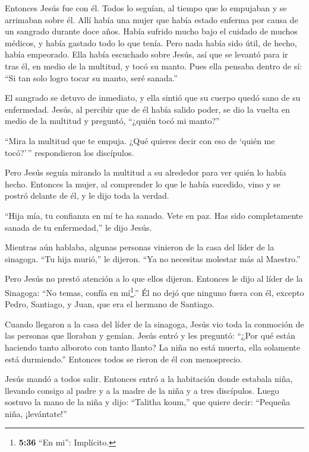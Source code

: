  Entonces Jesús fue con él. Todos lo seguían, al tiempo que
lo empujaban y se arrimaban sobre él.  Allí había una mujer
que había estado enferma por causa de un sangrado durante doce años.
 Había sufrido mucho bajo el cuidado de muchos médicos, y
había gastado todo lo que tenía. Pero nada había sido útil, de hecho,
había empeorado.  Ella había escuchado sobre Jesús, así que
se levantó para ir tras él, en medio de la multitud, y tocó su manto.
 Pues ella pensaba dentro de sí: ``Si tan solo logro tocar
su manto, seré sanada.''

 El sangrado se detuvo de inmediato, y ella sintió que su
cuerpo quedó sano de su enfermedad.  Jesús, al percibir que
de él había salido poder, se dio la vuelta en medio de la multitud y
preguntó, ``¿quién tocó mi manto?''

 ``Mira la multitud que te empuja. ¿Qué quieres decir con
eso de `quién me tocó?'\,'' respondieron los discípulos.

 Pero Jesús seguía mirando la multitud a su alrededor para
ver quién lo había hecho.  Entonces la mujer, al comprender
lo que le había sucedido, vino y se postró delante de él, y le dijo toda
la verdad.

 ``Hija mía, tu confianza en mí te ha sanado. Vete en paz.
Has sido completamente sanada de tu enfermedad,'' le dijo Jesús.

 Mientras aún hablaba, algunas personas vinieron de la casa
del líder de la sinagoga. ``Tu hija murió,'' le dijeron. ``Ya no
necesitas molestar más al Maestro.''

 Pero Jesús no prestó atención a lo que ellos dijeron.
Entonces le dijo al líder de la Sinagoga: ``No temas, confía en
mí\footnote{\textbf{5:36} ``En mi'': Implícito.}.''  Él no
dejó que ninguno fuera con él, excepto Pedro, Santiago, y Juan, que era
el hermano de Santiago.

 Cuando llegaron a la casa del líder de la sinagoga, Jesús
vio toda la conmoción de las personas que lloraban y gemían.
 Jesús entró y les preguntó: ``¿Por qué están haciendo
tanto alboroto con tanto llanto? La niña no está muerta, ella solamente
está durmiendo.''  Entonces todos se rieron de él con
menosprecio.

Jesús mandó a todos salir. Entonces entró a la habitación donde estabala
niña, llevando consigo al padre y a la madre de la niña y a tres
discípulos.  Luego sostuvo la mano de la niña y dijo:
``Talitha koum,'' que quiere decir: ``Pequeña niña, ¡levántate!''

